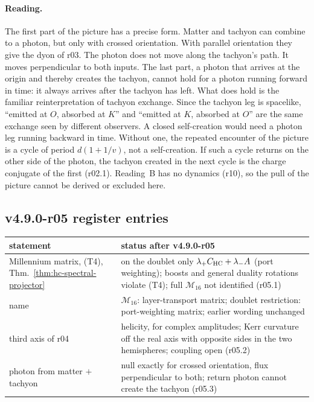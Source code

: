 \paragraph{Reading.}
The first part of the picture has a precise form.  Matter and tachyon can combine to a photon, but only with crossed
orientation.  With parallel orientation they give the dyon of r03.  The photon does not move along the tachyon's path.
It moves perpendicular to both inputs.  The last part, a photon that arrives at the origin and thereby creates the
tachyon, cannot hold for a photon running forward in time: it always arrives after the tachyon has left.  What does hold
is the familiar reinterpretation of tachyon exchange.  Since the tachyon leg is spacelike, ``emitted at \(O\), absorbed at
\(K\)'' and ``emitted at \(K\), absorbed at \(O\)'' are the same exchange seen by different observers.  A closed
self-creation would need a photon leg running backward in time.  Without one, the repeated encounter of the picture is a
cycle of period \(d(1+1/v)\), not a self-creation.  If such a cycle returns on the other side of the photon, the tachyon
created in the next cycle is the charge conjugate of the first (r02.1).  Reading~B has no dynamics (r10), so the pull of
the picture cannot be derived or excluded here.

\subsection*{v4.9.0-r05 register entries}
\label{subsec:v490-r05-register}

\begin{center}
\small
\begin{tabular}{@{}>{\raggedright\arraybackslash}p{}>{\raggedright\arraybackslash}p{}@{}}
\toprule
statement & status after v4.9.0-r05\\
\midrule
Millennium matrix, (T4), Thm.~\ref{thm:hc-spectral-projector} & on the doublet only \(\lambda_+C_{\mathrm{HC}}+\lambda_-A\) (port weighting); boosts and general duality rotations violate (T4); full \(\mathcal M_{16}\) not identified (r05.1)\\
name & \(\mathcal M_{16}\): layer-transport matrix; doublet restriction: port-weighting matrix; earlier wording unchanged\\
third axis of r04 & helicity, for complex amplitudes; Kerr curvature off the real axis with opposite sides in the two hemispheres; coupling open (r05.2)\\
photon from matter \(+\) tachyon & null exactly for crossed orientation, flux perpendicular to both; return photon cannot create the tachyon (r05.3)\\
\bottomrule
\end{tabular}
\end{center}

